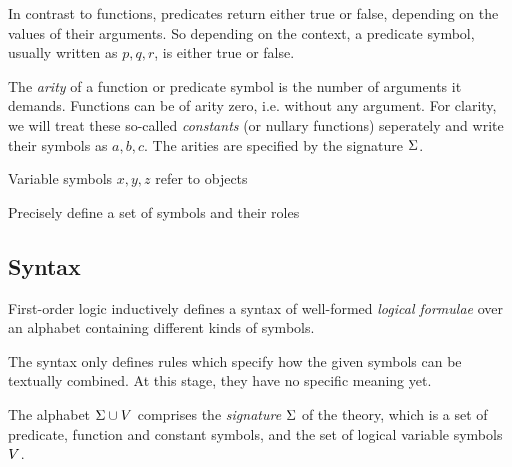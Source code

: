         In contrast to functions, predicates return either true or false, depending on the values of their arguments.
        So depending on the context, a predicate symbol, usually written as $p,q,r$, is either true or false.

        The \textit{arity} of a function or predicate symbol is the number of arguments it demands.
        Functions can be of arity zero, i.e. without any argument.
        For clarity, we will treat these so-called \textit{constants} (or nullary functions) seperately and write their symbols as $a,b,c$.
        The arities are specified by the signature $\Sigma$.

        Variable symbols $x,y,z$ refer to objects

        Precisely define a set of symbols and their roles

        \subsection{Syntax}
            \label{sec:FOL-syntax}

            First-order logic inductively defines a syntax of well-formed \textit{logical formulae} over an alphabet containing different kinds of symbols.

            The syntax only defines rules which specify how the given symbols can be textually combined. At this stage, they have no specific meaning yet.

            The alphabet $\Sigma\cup V$ comprises the \textit{signature} $\Sigma$ of the theory, which is a set of predicate, function and constant symbols, and the set of logical variable symbols $V$.

